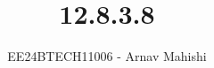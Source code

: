 \documentclass[journal]{IEEEtran}
\begin{document}

\vspace{3cm}

\title{12.8.3.8}
\author{EE24BTECH11006 - Arnav Mahishi}
{\let\newpage\relax\maketitle}

\renewcommand{\thefigure}{\theenumi}
\renewcommand{\thetable}{\theenumi}
\setlength{\intextsep}{10pt} %


\renewcommand{\thetable}{\theenumi}
\end{document}
